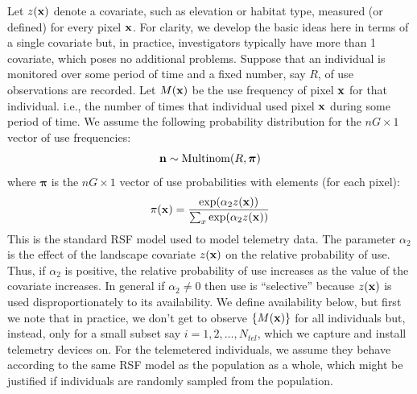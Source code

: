 \documentclass[12pt]{article}
\begin{document}
Let $z({\bf x})$ denote a covariate, such as elevation or habitat type,
measured (or defined) for every
pixel ${\bf x}$. For clarity, we develop the basic ideas here in terms
of a single covariate but, in practice, investigators typically have
more than 1 covariate, which poses no additional problems.
Suppose that an individual is monitored over some period of time
and a fixed number, say $R$, of use observations are recorded.
Let $M({\bf x})$ be the use frequency of pixel ${\bf x}$ for that individual.
i.e., the number of times that individual used pixel ${\bf x}$
during some period of time.
We assume the
following probability distribution for the $nG \times 1$ vector of use
frequencies:
\[
{\bf n} \sim \mbox{Multinom}(R, {\bm \pi})
\]
where ${\bm \pi}$ is the $nG \times 1$ vector of use probabilities
with elements (for each pixel):
\begin{equation}
 \pi({\bf x}) = \frac{ \exp( \alpha_{2} z({\bf x}) ) }
   { \sum_{x}    \exp(\alpha_{2} z({\bf x})) }
\label{rsf.eq.rsf0}
\end{equation}
This is the standard RSF model \citep{manly_etal:2002} used to model
telemetry data.
The parameter $\alpha_2$ is the effect of the
landscape covariate $z({\bf x})$ on the relative probability of
use. Thus, if $\alpha_2$ is positive, the relative probability of use
increases as the value of the covariate increases. In general if
$\alpha_2 \neq 0$ then use is ``selective'' because $z({\bf x})$
is used disproportionately to its availability. We define availability
below, but first we note that in
practice, we don't get to
observe $\{ M({\bf x}) \}$ for all individuals but, instead, only for a small
subset say $i=1,2,\ldots, N_{tel}$, which we capture and install telemetry devices on.
For the telemetered individuals, we assume they behave according
to the same RSF model as the population as a whole, which might be
justified if individuals are randomly sampled from the population.
\end{document}
